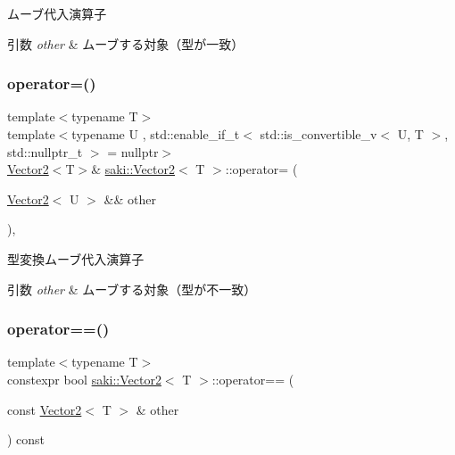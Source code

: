 ムーブ代入演算子 


\begin{DoxyParams}{引数}
{\em other} & ムーブする対象（型が一致） \\
\hline
\end{DoxyParams}
\mbox{\label{classsaki_1_1_vector2_acd72a6247e6c425fab7320457fb73e5e}} 
\subsubsection{\texorpdfstring{operator=()}{operator=()}\hspace{0.1cm}{\footnotesize\ttfamily [4/4]}}
{\footnotesize\ttfamily template$<$typename T$>$ \\
template$<$typename U , std\+::enable\+\_\+if\+\_\+t$<$ std\+::is\+\_\+convertible\+\_\+v$<$ U, T $>$, std\+::nullptr\+\_\+t $>$  = nullptr$>$ \\
\mbox{\hyperlink{classsaki_1_1_vector2}{Vector2}}$<$T$>$\& \mbox{\hyperlink{classsaki_1_1_vector2}{saki\+::\+Vector2}}$<$ T $>$\+::operator= (\begin{DoxyParamCaption}\item[{\mbox{\hyperlink{classsaki_1_1_vector2}{Vector2}}$<$ U $>$ \&\&}]{other }\end{DoxyParamCaption})\hspace{0.3cm}{\ttfamily [inline]}, {\ttfamily [noexcept]}}



型変換ムーブ代入演算子 


\begin{DoxyParams}{引数}
{\em other} & ムーブする対象（型が不一致） \\
\hline
\end{DoxyParams}
\mbox{\label{classsaki_1_1_vector2_a72b70031ffca3596e8df06cc4e84dc51}} 
\subsubsection{\texorpdfstring{operator==()}{operator==()}}
{\footnotesize\ttfamily template$<$typename T$>$ \\
constexpr bool \mbox{\hyperlink{classsaki_1_1_vector2}{saki\+::\+Vector2}}$<$ T $>$\+::operator== (\begin{DoxyParamCaption}\item[{const \mbox{\hyperlink{classsaki_1_1_vector2}{Vector2}}$<$ T $>$ \&}]{other }\end{DoxyParamCaption}) const\hspace{0.3cm}{\ttfamily [inline]}}



